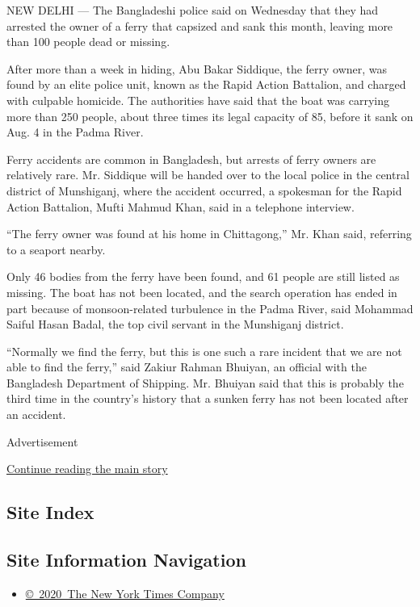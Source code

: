 NEW DELHI --- The Bangladeshi police said on Wednesday that they had
arrested the owner of a ferry that capsized and sank this month, leaving
more than 100 people dead or missing.

After more than a week in hiding, Abu Bakar Siddique, the ferry owner,
was found by an elite police unit, known as the Rapid Action Battalion,
and charged with culpable homicide. The authorities have said that the
boat was carrying more than 250 people, about three times its legal
capacity of 85, before it sank on Aug. 4 in the Padma River.

Ferry accidents are common in Bangladesh, but arrests of ferry owners
are relatively rare. Mr. Siddique will be handed over to the local
police in the central district of Munshiganj, where the accident
occurred, a spokesman for the Rapid Action Battalion, Mufti Mahmud Khan,
said in a telephone interview.

``The ferry owner was found at his home in Chittagong,'' Mr. Khan said,
referring to a seaport nearby.

Only 46 bodies from the ferry have been found, and 61 people are still
listed as missing. The boat has not been located, and the search
operation has ended in part because of monsoon-related turbulence in the
Padma River, said Mohammad Saiful Hasan Badal, the top civil servant in
the Munshiganj district.

``Normally we find the ferry, but this is one such a rare incident that
we are not able to find the ferry,'' said Zakiur Rahman Bhuiyan, an
official with the Bangladesh Department of Shipping. Mr. Bhuiyan said
that this is probably the third time in the country's history that a
sunken ferry has not been located after an accident.

Advertisement

\protect\hyperlink{after-bottom}{Continue reading the main story}

\hypertarget{site-index}{%
\subsection{Site Index}\label{site-index}}

\hypertarget{site-information-navigation}{%
\subsection{Site Information
Navigation}\label{site-information-navigation}}

\begin{itemize}
\tightlist
\item
  \href{https://help.nytimes.com/hc/en-us/articles/115014792127-Copyright-notice}{©~2020~The
  New York Times Company}
\end{itemize}


